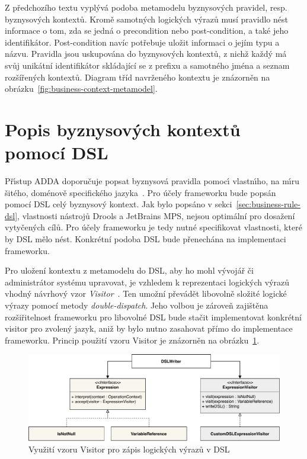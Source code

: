 Z předchozího textu vyplývá podoba metamodelu byznysových pravidel, resp. byznysových kontextů.
Kromě samotných logických výrazů musí pravidlo nést informace o tom, zda
se jedná o precondition nebo post-condition, a také jeho identifikátor.
Post-condition navíc potřebuje uložit informaci o jejím typu a názvu. Pravidla jsou uskupována
do byznysových kontextů, z nichž každý má svůj unikátní identifikátor skládající se z prefixu
a samotného jména a seznam rozšířených kontextů. Diagram tříd navrženého kontextu je znázorněn
na obrázku~\ref{fig:business-context-metamodel}.

\section{Popis byznysových kontextů pomocí \gls{DSL}}

Př\'{\i}stup \gls{ADDA} doporučuje popsat byznysová pravidla pomoc\'{\i}
vlastn\'{\i}ho, na m\'{\i}ru šitého, doménově specifického jazyka~\cite{cemus2015automated}.
Pro účely frameworku bude popsán pomocí \gls{DSL} celý byznysový kontext.
Jak bylo popsáno v sekci~\ref{sec:business-rule-dsl}, vlastnosti nástrojů Drools a JetBrains MPS,
nejsou optimální pro dosažení vytyčených cílů. Pro účely frameworku je tedy nutné specifikovat vlastnosti,
které by \gls{DSL} mělo nést. Konkrétní podoba DSL bude přenechána na implementaci frameworku.

Pro uložení kontextu z metamodelu do \gls{DSL}, aby ho mohl vývojář či administrátor
systému upravovat, je vzhledem k reprezentaci logických výrazů vhodný návrhový vzor
\textit{Visitor}~\cite{fowler2002patterns}. Ten umožní převádět libovolně složité logické
výrazy pomocí metody \textit{double-dispatch}. Jeho volbou je zároveň zajištěna rozšiřitelnost
frameworku pro libovolné \gls{DSL} \textendash\xspace bude stačit implementovat konkrétní
visitor pro zvolený jazyk, aniž by bylo nutno zasahovat přímo do implementace frameworku.
Princip použití vzoru Visitor je znázorněn na obrázku~\ref{fig:expression-visitor}.

\begin{figure}
    \centering
    \includegraphics[keepaspectratio=true, width=1\linewidth]{figures/expression-visitor.pdf}
    \caption{Využití vzoru Visitor pro zápis logických výrazů v \gls{DSL}}
    \label{fig:expression-visitor}
\end{figure}

